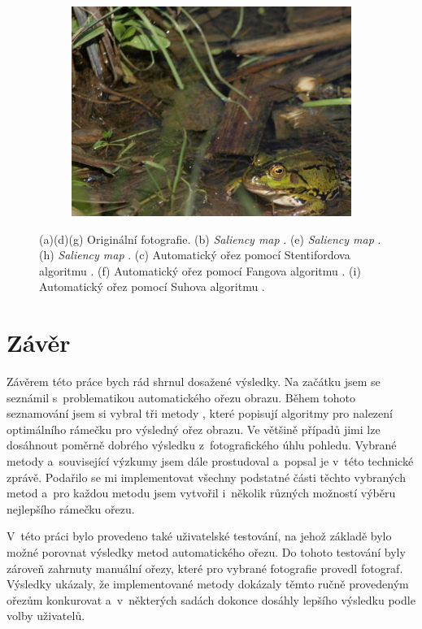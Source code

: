 \begin{figure}[H]
\begin{subfigure}{0.32\textwidth}
      \includegraphics[scale=1.0]{obrazky/badcropSuh.jpg}
      \caption{}
    \end{subfigure}
    \vspace{1pt}
    
\caption{(a)(d)(g) Originální fotografie. (b) \emph{Saliency map} \cite{Stentiford2007}. (e) \emph{Saliency map} \cite{Margolin2013}. (h) \emph{Saliency map} \cite{Itti1998}. (c) Automatický ořez pomocí Stentifordova algoritmu \cite{Stentiford2007}. (f) Automatický ořez pomocí Fangova algoritmu \cite{Fang2014}. (i) Automatický ořez pomocí Suhova algoritmu \cite{Suh2003}.}
\label{obr:autocropFails}
\end{figure}

\chapter{Závěr}
Závěrem této práce bych rád shrnul dosažené výsledky. Na začátku jsem se seznámil s~problematikou automatického ořezu obrazu. Během tohoto seznamování jsem si vybral tři metody \cite{Fang2014,Stentiford2007,Suh2003}, které popisují algoritmy pro nalezení optimálního rámečku pro výsledný ořez obrazu. Ve většině případů jimi lze dosáhnout poměrně dobrého výsledku z~fotografického úhlu pohledu. Vybrané metody a~související výzkumy jsem dále prostudoval a~popsal je v~této technické zprávě. Podařilo se mi implementovat všechny podstatné části těchto vybraných metod a~pro každou metodu jsem vytvořil i~několik různých možností výběru nejlepšího rámečku ořezu.

V~této práci bylo provedeno také uživatelské testování, na jehož základě bylo možné porovnat výsledky metod automatického ořezu. Do tohoto testování byly zároveň zahrnuty manuální ořezy, které pro vybrané fotografie provedl fotograf. Výsledky ukázaly, že implementované metody dokázaly těmto ručně provedeným ořezům konkurovat a~v~některých sadách dokonce dosáhly lepšího výsledku podle volby uživatelů.

